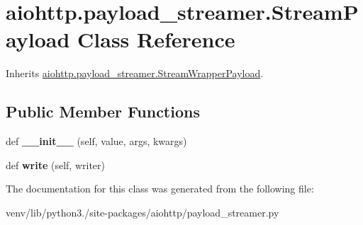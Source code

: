 \hypertarget{classaiohttp_1_1payload__streamer_1_1_stream_payload}{}\section{aiohttp.\+payload\+\_\+streamer.\+Stream\+Payload Class Reference}
\label{classaiohttp_1_1payload__streamer_1_1_stream_payload}


Inherits \hyperlink{classaiohttp_1_1payload__streamer_1_1_stream_wrapper_payload}{aiohttp.\+payload\+\_\+streamer.\+Stream\+Wrapper\+Payload}.

\subsection*{Public Member Functions}
\begin{DoxyCompactItemize}
\item 
\mbox{\label{classaiohttp_1_1payload__streamer_1_1_stream_payload_a22918a38764a716ed22cbd012e6fd664}} 
def {\bfseries \+\_\+\+\_\+init\+\_\+\+\_\+} (self, value, args, kwargs)
\item 
\mbox{\label{classaiohttp_1_1payload__streamer_1_1_stream_payload_a3afd351e16dad3cd5659a5f1eb7ef21d}} 
def {\bfseries write} (self, writer)
\end{DoxyCompactItemize}


The documentation for this class was generated from the following file\+:\begin{DoxyCompactItemize}
\item 
venv/lib/python3./site-\/packages/aiohttp/payload\+\_\+streamer.\+py\end{DoxyCompactItemize}
